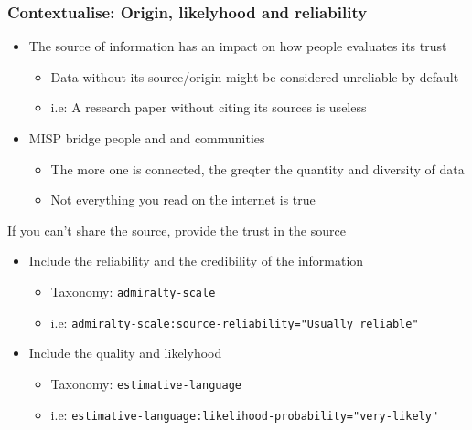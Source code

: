 \begin{frame}
    \frametitle{Contextualise: Origin, likelyhood and reliability}
    \begin{itemize}
        \item The source of information has an impact on how people evaluates its trust
        \begin{itemize}
            \item Data without its source/origin might be considered unreliable by default
            \item i.e: A research paper without citing its sources is useless
        \end{itemize}
        \item MISP bridge people and and communities
        \begin{itemize}
            \item The more one is connected, the greqter the quantity and diversity of data
            \item Not everything you read on the internet is true
        \end{itemize}
    \end{itemize}

    If you can't share the source, provide the trust in the source
    \begin{itemize}
        \item Include the reliability and the credibility of the information
            \begin{itemize}
                \item Taxonomy: \texttt{admiralty-scale}
                \item i.e: \texttt{admiralty-scale:source-reliability="Usually reliable"}
            \end{itemize}
        \item Include the quality and likelyhood
            \begin{itemize}
                \item Taxonomy: \texttt{estimative-language}
                \item i.e: \texttt{estimative-language:likelihood-probability="very-likely"}
            \end{itemize}
    \end{itemize}
\end{frame}

